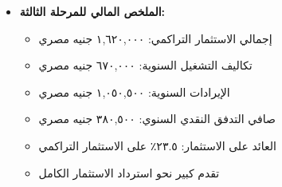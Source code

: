 \begin{itemize}
    \item \textbf{الملخص المالي للمرحلة الثالثة:}
    \begin{itemize}
        \item إجمالي الاستثمار التراكمي: ١,٦٢٠,٠٠٠ جنيه مصري
        \item تكاليف التشغيل السنوية: ٦٧٠,٠٠٠ جنيه مصري
        \item الإيرادات السنوية: ١,٠٥٠,٥٠٠ جنيه مصري
        \item صافي التدفق النقدي السنوي: ٣٨٠,٥٠٠ جنيه مصري
        \item العائد على الاستثمار: ٢٣.٥٪ على الاستثمار التراكمي
        \item تقدم كبير نحو استرداد الاستثمار الكامل
    \end{itemize}
\end{itemize}


